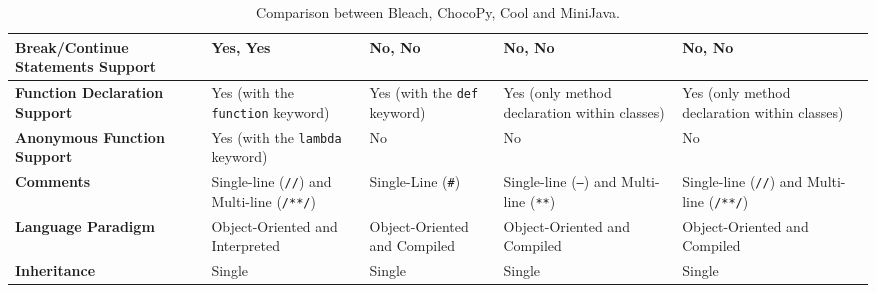 \begin{table}[h!]
\begin{tabular}{|p{3.2cm}|p{3cm}|p{3cm}|p{3cm}|p{3cm}|p{3cm}|}
        \hline
        \textbf{Break/Continue Statements Support} & Yes, Yes & No, No & No, No & No, No \\
        \hline
        \textbf{Function Declaration Support} & Yes (with the \texttt{function} keyword) & Yes (with the \texttt{def} keyword) & Yes (only method declaration within classes) & Yes (only method declaration within classes) \\
        \hline
        \textbf{Anonymous Function Support} & Yes (with the \texttt{lambda} keyword) & No & No & No \\
        \hline
        \textbf{Comments} & Single-line (\texttt{//}) and Multi-line (\texttt{/**/}) & Single-Line (\texttt{\#}) & Single-line (\texttt{---}) and Multi-line (\texttt{**}) & Single-line (\texttt{//}) and Multi-line (\texttt{/**/}) \\
        \hline
        \textbf{Language Paradigm} & Object-Oriented and Interpreted & Object-Oriented and Compiled & Object-Oriented and Compiled & Object-Oriented and Compiled \\
        \hline
        \textbf{Inheritance} & Single & Single & Single & Single \\
        \hline
    \end{tabular}
    \caption{Comparison between Bleach, ChocoPy, Cool and MiniJava.}
    \label{tab:example5x5}
\end{table}